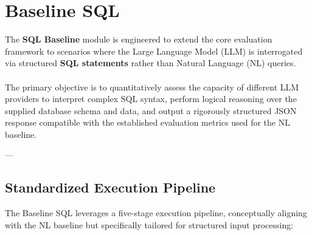 \section{Baseline SQL}
\label{sec:baseline-sql}
\vspace{2em}

The \textbf{SQL Baseline} module is engineered to extend the core evaluation framework to scenarios where the Large Language Model (LLM) is interrogated via structured \textbf{SQL statements} rather than Natural Language (NL) queries.\\\\
The primary objective is to quantitatively assess the capacity of different LLM providers to interpret complex SQL syntax, perform logical reasoning over the supplied database schema and data, and output a rigorously structured JSON response compatible with the established evaluation metrics used for the NL baseline.

---

\subsection{Standardized Execution Pipeline}

The Baseline SQL leverages a five-stage execution pipeline, conceptually aligning with the NL baseline but specifically tailored for structured input processing:

